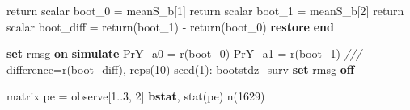 \documentclass[
  10pt,
]{book}
\newenvironment{Shaded}{\begin{snugshade}}{\end{snugshade}}
\newcommand{\CommentTok}[1]{\textcolor[rgb]{0.56,0.35,0.01}{\textit{#1}}}
\newcommand{\DecValTok}[1]{\textcolor[rgb]{0.00,0.00,0.81}{#1}}
\newcommand{\FunctionTok}[1]{\textcolor[rgb]{0.00,0.00,0.00}{#1}}
\newcommand{\KeywordTok}[1]{\textcolor[rgb]{0.13,0.29,0.53}{\textbf{#1}}}
\newcommand{\NormalTok}[1]{#1}
\begin{document}
\begin{Shaded}
\begin{Highlighting}[]
\FunctionTok{return} \FunctionTok{scalar}\NormalTok{ boot\_0 = meanS\_b[1]}
\FunctionTok{return} \FunctionTok{scalar}\NormalTok{ boot\_1 = meanS\_b[2]}
\FunctionTok{return} \FunctionTok{scalar}\NormalTok{ boot\_diff = }\FunctionTok{return}\NormalTok{(boot\_1) {-} }\FunctionTok{return}\NormalTok{(boot\_0)}
\KeywordTok{restore}
\KeywordTok{end}

\KeywordTok{set} \DecValTok{rmsg} \KeywordTok{on}
\KeywordTok{simulate}\NormalTok{ PrY\_a0 = }\FunctionTok{r}\NormalTok{(boot\_0) PrY\_a1 = }\FunctionTok{r}\NormalTok{(boot\_1) }\CommentTok{///}
\NormalTok{  difference=}\FunctionTok{r}\NormalTok{(boot\_diff), reps(10) }\DecValTok{seed}\NormalTok{(1): bootstdz\_surv}
\KeywordTok{set} \DecValTok{rmsg} \KeywordTok{off} 
 
\FunctionTok{matrix}\NormalTok{ pe = observe[1..3, 2]\textquotesingle{}}
\KeywordTok{bstat}\NormalTok{, stat(pe) n(1629)}
\end{Highlighting}
\end{Shaded}
\end{document}
